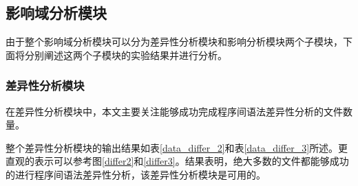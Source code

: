 \subsection{影响域分析模块}

由于整个影响域分析模块可以分为差异性分析模块和影响分析模块两个子模块，下面将分别阐述这两个子模块的实验结果并进行分析。

\subsubsection{差异性分析模块}

在差异性分析模块中，本文主要关注能够成功完成程序间语法差异性分析的文件数量。

%
%
%
%
整个差异性分析模块的输出结果如表\ref {data_differ_2}和表\ref {data_differ_3}所述。更直观的表示可以参考图\ref {differ2}和\ref {differ3}。结果表明，绝大多数的文件都能够成功的进行程序间语法差异性分析，该差异性分析模块是可用的。

